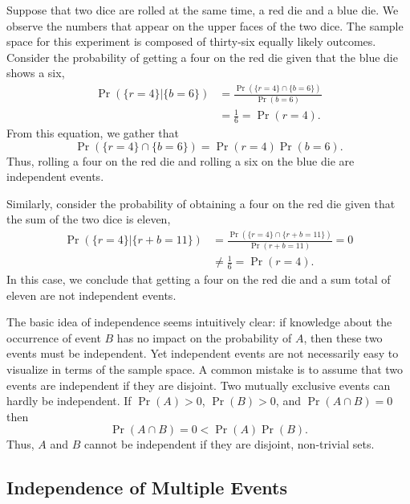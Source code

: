 \begin{example}
Suppose that two dice are rolled at the same time, a red die and a blue die.
We observe the numbers that appear on the upper faces of the two dice.
The sample space for this experiment is composed of thirty-six equally likely outcomes.
Consider the probability of getting a four on the red die given that the blue die shows a six,
\begin{equation*}
\begin{split}
\Pr (\{ r=4 \} | \{ b=6 \})
&= \frac{ \Pr (\{ r=4 \} \cap \{ b=6 \}) }
{ \Pr ( b=6 ) } \\
&= \frac{1}{6} = \Pr ( r=4 ) .
\end{split}
\end{equation*}
From this equation, we gather that
\begin{equation*}
\Pr (\{ r=4 \} \cap \{ b=6 \})
= \Pr ( r=4 ) \Pr ( b=6 ) .
\end{equation*}
Thus, rolling a four on the red die and rolling a six on the blue die are independent events.

Similarly, consider the probability of obtaining a four on the red die given that the sum of the two dice is eleven,
\begin{equation*}
\begin{split}
\Pr (\{ r=4 \} | \{ r+b=11 \})
&= \frac{ \Pr (\{ r=4 \} \cap \{ r+b=11 \}) }
{ \Pr ( r+b=11 ) } = 0 \\
&\neq \frac{1}{6} = \Pr ( r=4 ) .
\end{split}
\end{equation*}
In this case, we conclude that getting a four on the red die and a sum total of eleven are not independent events.
\end{example}

The basic idea of independence seems intuitively clear: if knowledge about the occurrence of event $B$ has no impact on the probability of $A$, then these two events must be independent.
Yet independent events are not necessarily easy to visualize in terms of the sample space.
A common mistake is to assume that two events are independent if they are disjoint.
Two mutually exclusive events can hardly be independent.
If $\Pr (A) > 0$, $\Pr (B) > 0$, and $\Pr (A \cap B) = 0$ then
\begin{equation*}
\Pr (A \cap B) = 0 < \Pr (A) \Pr(B).
\end{equation*}
Thus, $A$ and $B$ cannot be independent if they are disjoint, non-trivial sets.


\subsection{Independence of Multiple Events}

